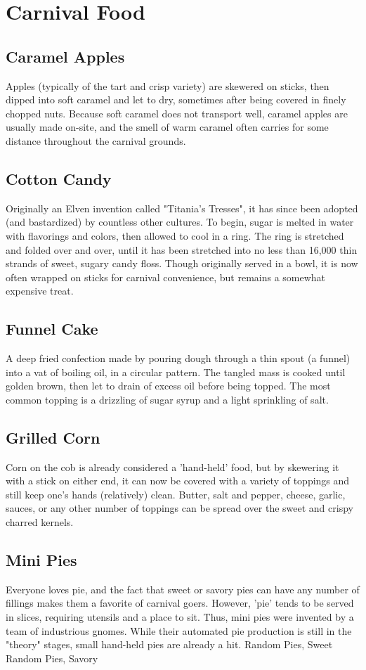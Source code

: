 \documentclass[10pt,a4paper,twoside,twocolumn,openany,bg=print,nodeprecatedcode]{dndbook}
\begin{document}
\section{Carnival Food}
\subsection{Caramel Apples}
Apples (typically of the tart and crisp variety) are skewered on sticks, then dipped into soft caramel and let to dry, sometimes after being covered in finely chopped nuts. Because soft caramel does not transport well, caramel apples are usually made on-site, and the smell of warm caramel often carries for some distance throughout the carnival grounds.
\subsection{Cotton Candy}
Originally an Elven invention called "Titania's Tresses", it has since been adopted (and bastardized) by countless other cultures. To begin, sugar is melted in water with flavorings and colors, then allowed to cool in a ring. The ring is stretched and folded over and over, until it has been stretched into no less than 16,000 thin strands of sweet, sugary candy floss. Though originally served in a bowl, it is now often wrapped on sticks for carnival convenience, but remains a somewhat expensive treat.
\subsection{Funnel Cake}
A deep fried confection made by pouring dough through a thin spout (a funnel) into a vat of boiling oil, in a circular pattern. The tangled mass is cooked until golden brown, then let to drain of excess oil before being topped. The most common topping is a drizzling of sugar syrup and a light sprinkling of salt.
\subsection{Grilled Corn}
Corn on the cob is already considered a 'hand-held' food, but by skewering it with a stick on either end, it can now be covered with a variety of toppings and still keep one's hands (relatively) clean. Butter, salt and pepper, cheese, garlic, sauces, or any other number of toppings can be spread over the sweet and crispy charred kernels.
\subsection{Mini Pies}
Everyone loves pie, and the fact that sweet or savory pies can have any number of fillings makes them a favorite of carnival goers. However, 'pie' tends to be served in slices, requiring utensils and a place to sit. Thus, mini pies were invented by a team of industrious gnomes. While their automated pie production is still in the "theory" stages, small hand-held pies are already a hit.
Random Pies, Sweet
Random Pies, Savory
\end{document}
